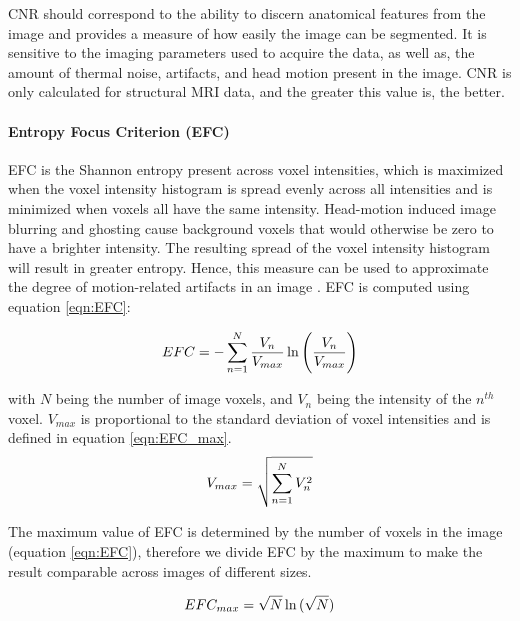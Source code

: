 CNR should correspond to the ability to discern anatomical features from the image and provides a measure of how easily the image can be segmented. It is sensitive to the imaging parameters used to acquire the data, as well as, the amount of thermal noise, artifacts, and head motion present in the image. CNR is only calculated for structural MRI data, and the greater this value is, the better.

\paragraph{Entropy Focus Criterion (EFC)}
\label{sec:EFC}
EFC is the Shannon entropy present across voxel intensities, which is maximized when the voxel intensity histogram is spread evenly across all intensities and is minimized when voxels all have the same intensity.  Head-motion induced image blurring and ghosting cause background voxels that would otherwise be zero to have a brighter intensity. The resulting spread of the voxel intensity histogram will result in greater entropy. Hence, this measure can be used to approximate the degree of motion-related artifacts in an image \citep{atkinson1997}. EFC is computed using equation \ref{eqn:EFC}:

\begin{equation}
\label{eqn:EFC}
EFC = - \sum_{n=1}^{N} \frac{V_n}{V_{max}} \ln{\Bigg(\frac{V_n}{V_{max}}\Bigg)} \\
\end{equation}

\noindent with $N$ being the number of image voxels, and $V_n$ being the intensity of the $n^{th}$ voxel. $V_{max}$ is proportional to the standard deviation of voxel intensities and is defined in equation \ref{eqn:EFC_max}.\\

\begin{equation}
\label{eqn:EFC_max}
V_{max} = \sqrt{\sum_{n=1}^{N} V_{n}^{2}} \\
\end{equation}

The maximum value of EFC is determined by the number of voxels in the image (equation \ref{eqn:EFC}), therefore we divide EFC by the maximum to make the result comparable across images of different sizes.

\begin{equation}
\label{eqn:EFCnorm}
EFC_{max} = \sqrt{N}\ln{(\sqrt{N})} \\
\end{equation}

